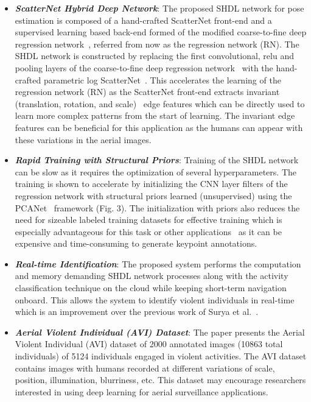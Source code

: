 \documentclass[10pt,twocolumn,letterpaper]{article}
\begin{document}
\begin{itemize}
\item \textbf{\textit{ScatterNet Hybrid Deep Network}}: The proposed SHDL network for pose estimation is composed of a hand-crafted ScatterNet front-end and a supervised learning based back-end formed of the modified coarse-to-fine deep regression network~\cite{belagiannis2015robust}, referred from now as the regression network (RN). The SHDL network is constructed by replacing the first convolutional, relu and pooling layers of the coarse-to-fine deep regression network~\cite{belagiannis2015robust} with the hand-crafted parametric log ScatterNet~\cite{singh}. This accelerates the learning of the regression network (RN) as the ScatterNet front-end extracts invariant (translation, rotation, and scale)~\cite{sifre2013} edge features which can be directly used to learn more complex patterns from the start of learning.  The invariant edge features can be beneficial for this application as the humans can appear with these variations in the aerial images. 

\item \textbf{\textit{Rapid Training with Structural Priors}}: Training of the SHDL network can be slow as it requires the optimization of several hyperparameters. The training is shown to accelerate by initializing the CNN layer filters of the regression network with structural priors learned (unsupervised) using the PCANet~\cite{pcanet} framework (Fig. 3). The initialization with priors also reduces the need for sizeable labeled training datasets for effective training which is especially advantageous for this task or other applications~\cite{tsshdl,jain} as it can be expensive and time-consuming to generate keypoint annotations.

\item \textbf{\textit{Real-time Identification}}: The proposed system performs the computation and memory demanding SHDL network processes along with the activity classification technique on the cloud while keeping short-term navigation onboard. This allows the system to identify violent individuals in real-time which is an improvement over the previous work of Surya et al.~\cite{penmetsa2014autonomous}. 

\item \textbf{\textit{Aerial Violent Individual (AVI) Dataset}}: The paper presents the  Aerial Violent Individual (AVI) dataset of 2000 annotated images (10863 total individuals) of 5124 individuals engaged in violent activities. The AVI dataset contains images with humans recorded at different variations of scale, position, illumination, blurriness, etc. This dataset may encourage researchers interested in using deep learning for aerial surveillance applications.
\end{itemize}
\end{document}
